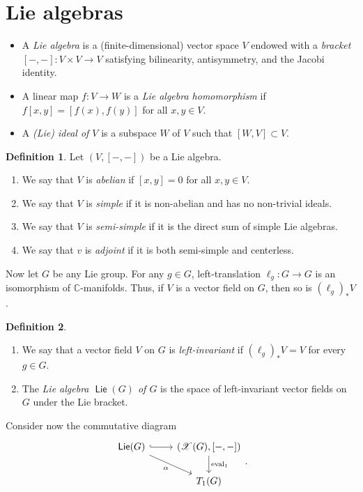 \documentclass[10pt,letterpaper,cm]{nupset}
\theoremstyle{definition}
\newtheorem{defn}{Definition}[subsection]
\theoremstyle{theorem}
\theoremstyle{remark}
\newcommand{\C}{\mathbb C}
\newcommand{\X}{\mathscr X}
\newcommand{\1}{\mathbb{1}}
\newcommand{\0}{\vec 0}
\DeclareMathOperator{\lie}{\mathsf{Lie}}
\DeclareMathOperator{\ev}{eval}
\newcommand{\bi}{\begin{itemize}}
\newcommand{\ei}{\end{itemize}}
\newcommand{\be}{\begin{enumerate}}
\newcommand{\ee}{\end{enumerate}}
\begin{document}
\section{Lie algebras}

\bi
\item[] A \textit{Lie algebra} is a (finite-dimensional) vector space $V$  endowed with a \textit{bracket $\left[{-}, {-}\right] : V \times V \to V$} satisfying bilinearity, antisymmetry, and the Jacobi identity.
\item[] A linear map $f: V\to W$ is a \textit{Lie algebra homomorphism} if $f\left[x,y\right] = \left[f(x), f(y)\right]$ for all $x,y\in V$.
 \item[] A \textit{(Lie) ideal of $V$} is a subspace $W$ of $V$ such that $\left[W, V\right] \subset  V$.
 \ei
 
 \pagebreak
 
 \begin{defn}  Let $\left(V, \left[{-}, {-}\right]\right)$ be a Lie algebra.
\be
\item We say that $V$ is \textit{abelian} if $\left[x,y\right] =0$ for all $x,y\in V$.
\item We say that $V$ is \textit{simple} if it is non-abelian and  has no non-trivial ideals.
\item We say that $V$ is \textit{semi-simple} if  it is the direct sum of simple Lie algebras. 
\item We say that $v$ is \textit{adjoint} if it is both semi-simple and centerless.
\ee 
 \end{defn}
 
 \medskip

Now let $G$ be any Lie group. For any $g\in G$, left-translation $\ell_g : G \to G$ is an isomorphism of $\C$-manifolds. Thus, if $V$ is a vector field on $G$, then so is $\left(\ell_g\right)_{\ast}{V}$.


\begin{defn} $ $
\be
\item We say that a vector field $V$ on $G$ is \textit{left-invariant} if $\left(\ell_g\right)_{\ast}{V} = V$ for every $g\in G$.
\item The \textit{Lie algebra $\lie(G)$ of $G$} is the space of left-invariant vector fields on $G$ under the Lie bracket.
\ee
\end{defn}

Consider now the commutative diagram
\[
\begin{tikzcd}
\lie(G) \arrow[r, hook] \arrow[rd, "\alpha"'] & {\left(\X(G), \left[{-},{-}\right]\right)} \arrow[d, "\ev_1"] \\
                                         & T_1(G)                                   
\end{tikzcd}.
\]
\end{document}
